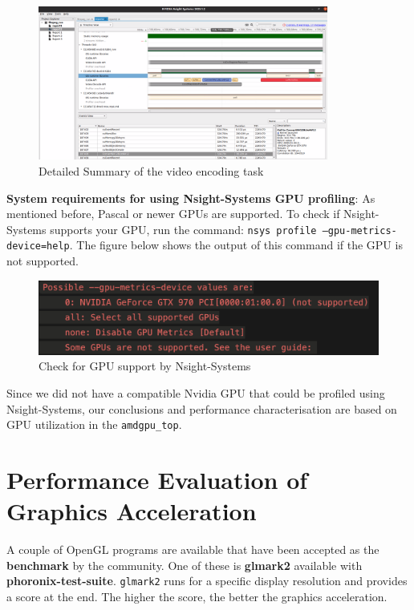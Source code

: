 \documentclass[a4paper,12pt, final]{report}
\begin{document}
\begin{figure}[H]
    \centering
    \includegraphics[width=0.85\textwidth]{images/nsight3.png}
    \caption{Detailed Summary of the video encoding task}
    \label{fig:detailed_summ_nsight}
\end{figure}

\noindent \textbf{System requirements for using Nsight-Systems GPU profiling}: As mentioned before, Pascal or newer GPUs are supported. To check if Nsight-Systems supports your GPU, run the command: \texttt{nsys profile --gpu-metrics-device=help}. The figure below shows the output of this command if the GPU is not supported.

\begin{figure}[H]
    \centering
    \includegraphics[width=\textwidth]{images/nsys_check.png}
    \caption{Check for GPU support by Nsight-Systems}
    \label{fig:nsys_check}
\end{figure}

\noindent Since we did not have a compatible Nvidia GPU that could be profiled using Nsight-Systems, our conclusions and performance characterisation are based on GPU utilization in the \verb|amdgpu_top|.

\section{Performance Evaluation of Graphics Acceleration} \label{dry_run_tests}
A couple of OpenGL programs are available that have been accepted as the \textbf{benchmark} by the community. One of these is \textbf{glmark2} available with \textbf{phoronix-test-suite}. \verb|glmark2| runs for a specific display resolution and provides a score at the end. The higher the score, the better the graphics acceleration.\\
\end{document}
